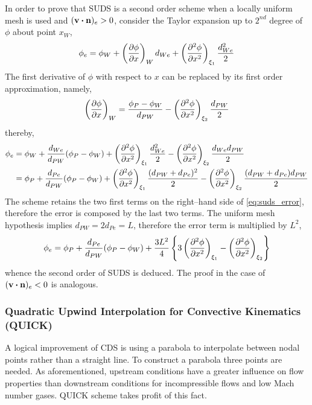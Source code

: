 In order to prove that SUDS is a second order scheme when a locally uniform mesh is used and $(\vb{v} \vdot \vb{n})_e > 0$, consider the Taylor expansion up to $2^{nd}$ degree of $\phi$ about point $x_W$,
\begin{equation}
	\phi_e = 
	\phi_W + 
	\left( \pdv{\phi}{x} \right)_W d_{We} + 
	\left( \pdv[2]{\phi}{x} \right)_{\xi_1} \frac{d_{We}^2}{2}
\end{equation}
The first derivative of $\phi$ with respect to $x$ can be replaced by its first order approximation, namely,
\begin{equation}
	\left(\pdv{\phi}{x}\right)_W = 
	\frac{\phi_P - \phi_W}{d_{PW}} - \left(\pdv[2]{\phi}{x}\right)_{\xi_2} \frac{d_{PW}}{2}
\end{equation}
thereby,
\begin{align}
	\phi_e 
	&= 
	\phi_W + 
	\frac{d_{We}}{d_{PW}} (\phi_P - \phi_W) + 
	\left( \pdv[2]{\phi}{x} \right)_{\xi_1} \frac{d_{We}^2}{2} - 
	\left( \pdv[2]{\phi}{x} \right)_{\xi_2} \frac{d_{We} d_{PW}}{2} \nonumber \\
	&= 
	\phi_P + 
	\frac{d_{Pe}}{d_{PW}} (\phi_P - \phi_W) + 
	\left( \pdv[2]{\phi}{x} \right)_{\xi_1} \frac{(d_{PW} + d_{Pe})^2}{2} - 
	\left( \pdv[2]{\phi}{x} \right)_{\xi_2} \frac{(d_{PW} + d_{Pe}) d_{PW}}{2}	
	\label{eq:suds_error}
\end{align}
The scheme retains the two first terms on the right--hand side of \eqref{eq:suds_error}, therefore the error is composed by the last two terms. The uniform mesh hypothesis implies $d_{PW} = 2 d_{Pe} = L$, therefore the error term is multiplied by $L^2$,
\begin{equation}
	\phi_e = 
	\phi_P + \frac{d_{Pe}}{d_{PW}} (\phi_P - \phi_W) + 
	\frac{3 L^2}{4}
	\left\{
	3 \left( \pdv[2]{\phi}{x} \right)_{\xi_1} - \left( \pdv[2]{\phi}{x} \right)_{\xi_2}
	\right\}
\end{equation}
whence the second order of SUDS is deduced. The proof in the case of $(\vb{v} \vdot \vb{n})_e < 0$ is analogous.



\subsubsection{Quadratic Upwind Interpolation for Convective Kinematics (QUICK)}

A logical improvement of CDS is using a parabola to interpolate between nodal points rather than a straight line. To construct a parabola three points are needed. As aforementioned, upstream conditions have a greater influence on flow properties than downstream conditions for incompressible flows and low Mach number gases. QUICK scheme takes profit of this fact. 

